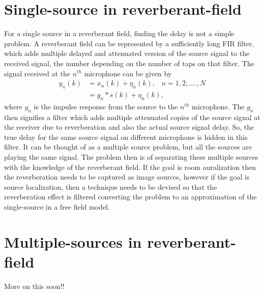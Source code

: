\section{Single-source in reverberant-field}

For a single source in a reverberant field, finding the delay is not a simple problem. A reverberant field can be represented by a sufficiently long FIR filter, which adds multiple delayed and attenuated version of the source signal to the received signal, the number depending on the number of taps on that filter. The signal received at the $n^{th}$ microphone can be given by
\begin{equation}
    \begin{split}
         y_n(k) &= x_n(k) + \eta_n(k),\hspace{10pt} n = 1,2,....,N \\
                &= g_n*s(k) + \eta_n(k),
    \end{split}
\end{equation}
where $g_n$ is the impulse response from the source to the $n^{th}$ microphone. 
The $g_n$ then signifies a filter which adds multiple attenuated copies of the source signal at the receiver due to reverberation and also the actual source signal delay. So, the true delay for the same source signal on different microphone is hidden in this filter. It can be thought of as a multiple source problem, but all the sources are playing the same signal. The problem then is of separating these multiple sources with the knowledge of the reverberant field. If the goal is room auralization then the reverberation needs to be captured as image sources, however if the goal is source localization, then a technique needs to be devised so that the reverberation effect is filtered converting the problem to an approximation of the single-source in a free field model. 

\section{Multiple-sources in reverberant-field}
More on this soon!!